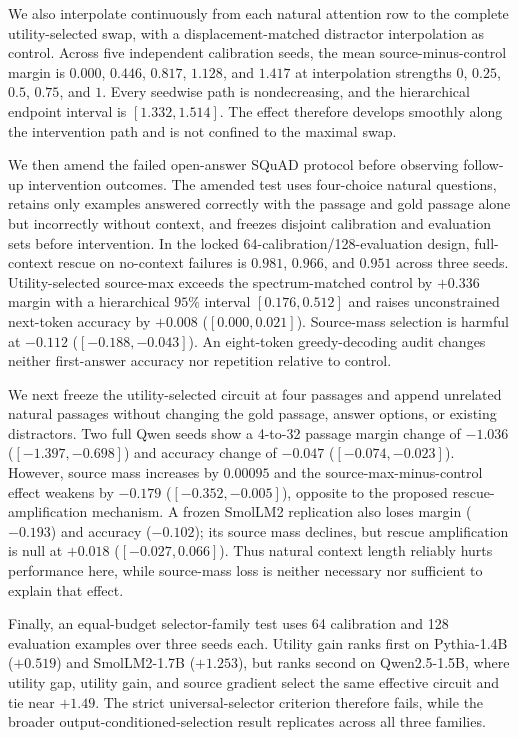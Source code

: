 \documentclass[letterpaper]{article} %
\begin{document}
We also interpolate continuously from each natural attention row to the complete utility-selected swap,
with a displacement-matched distractor interpolation as control.
Across five independent calibration seeds, the mean source-minus-control margin is $0.000$, $0.446$,
$0.817$, $1.128$, and $1.417$ at interpolation strengths $0$, $0.25$, $0.5$, $0.75$, and $1$.
Every seedwise path is nondecreasing, and the hierarchical endpoint interval is $[1.332,1.514]$.
The effect therefore develops smoothly along the intervention path and is not confined to the maximal swap.

We then amend the failed open-answer SQuAD protocol before observing follow-up intervention outcomes.
The amended test uses four-choice natural questions, retains only examples answered correctly with the
passage and gold passage alone but incorrectly without context, and freezes disjoint calibration and
evaluation sets before intervention. In the locked 64-calibration/128-evaluation design, full-context
rescue on no-context failures is $0.981$, $0.966$, and $0.951$ across three seeds.
Utility-selected source-max exceeds the spectrum-matched control by $+0.336$ margin with a hierarchical
$95\%$ interval $[0.176,0.512]$ and raises unconstrained next-token accuracy by $+0.008$
($[0.000,0.021]$). Source-mass selection is harmful at $-0.112$ ($[-0.188,-0.043]$).
An eight-token greedy-decoding audit changes neither first-answer accuracy nor repetition relative to control.

We next freeze the utility-selected circuit at four passages and append unrelated natural passages without
changing the gold passage, answer options, or existing distractors. Two full Qwen seeds show a 4-to-32
passage margin change of $-1.036$ ($[-1.397,-0.698]$) and accuracy change of $-0.047$
($[-0.074,-0.023]$). However, source mass increases by $0.00095$ and the source-max-minus-control effect
weakens by $-0.179$ ($[-0.352,-0.005]$), opposite to the proposed rescue-amplification mechanism.
A frozen SmolLM2 replication also loses margin ($-0.193$) and accuracy ($-0.102$); its source mass declines,
but rescue amplification is null at $+0.018$ ($[-0.027,0.066]$). Thus natural context length reliably hurts
performance here, while source-mass loss is neither necessary nor sufficient to explain that effect.

Finally, an equal-budget selector-family test uses 64 calibration and 128 evaluation examples over three
seeds each. Utility gain ranks first on Pythia-1.4B ($+0.519$) and SmolLM2-1.7B ($+1.253$), but ranks
second on Qwen2.5-1.5B, where utility gap, utility gain, and source gradient select the same effective
circuit and tie near $+1.49$. The strict universal-selector criterion therefore fails, while the broader
output-conditioned-selection result replicates across all three families.
\end{document}

